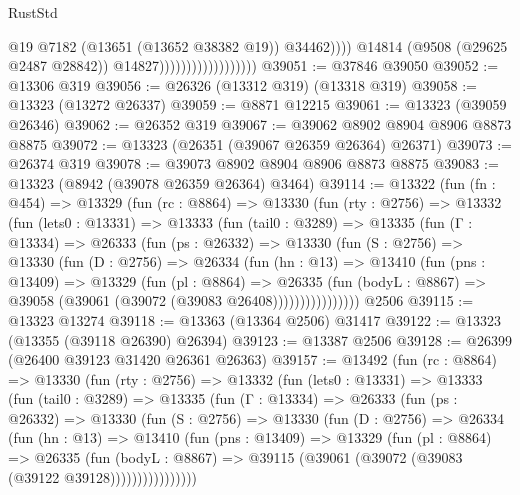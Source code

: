 \begin{lexlean}{RustStd}
\begin{coremodule}
                                                @19
                                                @7182
                                                (@13651 (@13652 @38382 @19))
                                                @34462))))
                                        @14814
                                        (@9508 (@29625 @2487 @28842))
                                        @14827))))))))))))))))))
@39051 := @37846 @39050
@39052 := @13306 @319
@39056 := @26326 (@13312 @319) (@13318 @319)
@39058 := @13323 (@13272 @26337)
@39059 := @8871 @12215
@39061 := @13323 (@39059 @26346)
@39062 := @26352 @319
@39067 := @39062 @8902 @8904 @8906 @8873 @8875
@39072 := @13323 (@26351 (@39067 @26359 @26364) @26371)
@39073 := @26374 @319
@39078 := @39073 @8902 @8904 @8906 @8873 @8875
@39083 := @13323 (@8942 (@39078 @26359 @26364) @3464)
@39114 := @13322
    (fun (fn : @454) =>
    @13329
      (fun (rc : @8864) =>
      @13330
        (fun (rty : @2756) =>
        @13332
          (fun (lets0 : @13331) =>
          @13333
            (fun (tail0 : @3289) =>
            @13335
              (fun (Γ : @13334) =>
              @26333
                (fun (ps : @26332) =>
                @13330
                  (fun (S : @2756) =>
                  @13330
                    (fun (D : @2756) =>
                    @26334
                      (fun (hn : @13) =>
                      @13410
                        (fun (pns : @13409) =>
                        @13329
                          (fun (pl : @8864) =>
                          @26335
                            (fun (bodyL : @8867) =>
                            @39058 (@39061 (@39072 (@39083 @26408))))))))))))))))
    @2506
@39115 := @13323 @13274
@39118 := @13363 (@13364 @2506) @31417
@39122 := @13323 (@13355 (@39118 @26390) @26394)
@39123 := @13387 @2506
@39128 := @26399 (@26400 @39123 @31420 @26361 @26363)
@39157 := @13492
    (fun (rc : @8864) =>
    @13330
      (fun (rty : @2756) =>
      @13332
        (fun (lets0 : @13331) =>
        @13333
          (fun (tail0 : @3289) =>
          @13335
            (fun (Γ : @13334) =>
            @26333
              (fun (ps : @26332) =>
              @13330
                (fun (S : @2756) =>
                @13330
                  (fun (D : @2756) =>
                  @26334
                    (fun (hn : @13) =>
                    @13410
                      (fun (pns : @13409) =>
                      @13329
                        (fun (pl : @8864) =>
                        @26335
                          (fun (bodyL : @8867) =>
                          @39115 (@39061 (@39072 (@39083 (@39122 @39128))))))))))))))))

\end{coremodule}
\end{lexlean}
